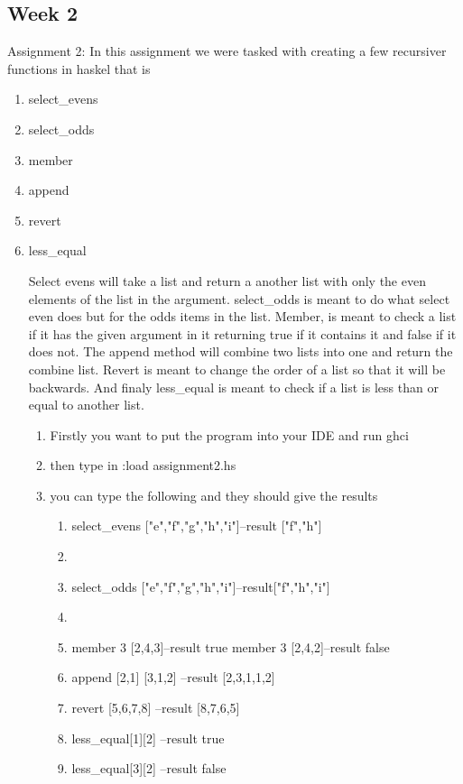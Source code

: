 \documentclass{article}
\theoremstyle{theorem}
\theoremstyle{definition}
\theoremstyle{remark}
\begin{document}
\subsection{Week 2}
 Assignment 2: In this assignment we were tasked with creating a few recursiver functions in haskel that is  
  
\begin{enumerate}

\item select_evens
\item select_odds
\item member
\item append
\item revert
\item less_equal

Select evens will take a list and return a another list with only the even elements of the list in the argument. select_odds is meant to do what select even does but for the odds items in the list. Member, is meant to check a list if it has the given argument in it returning true if it contains it and false if it does not. The append method will combine two lists into one and return the combine list. Revert is meant to change the order of a list so that it will be backwards. And finaly less_equal is meant to check if a list is less than or equal to another list. 
\begin{enumerate}

\item Firstly you want to put the program into your IDE and run ghci
\item then type in  :load assignment2.hs
\item you can type the following  and they should give the results
   \begin{enumerate}

\item select_evens ["e","f","g","h","i"]--result ["f","h"]
\item 
\item select_odds ["e","f","g","h","i"]--result["f","h","i"]
\item 
\item member 3 [2,4,3]--result true member 3 [2,4,2]--result false
\item 
append [2,1] [3,1,2]
--result [2,3,1,1,2]
\item revert [5,6,7,8]
--result [8,7,6,5]
\item less_equal[1][2]
--result true
\item less_equal[3][2]
--result false


\end{enumerate}
\end{enumerate}
\end{enumerate}
\end{document}
